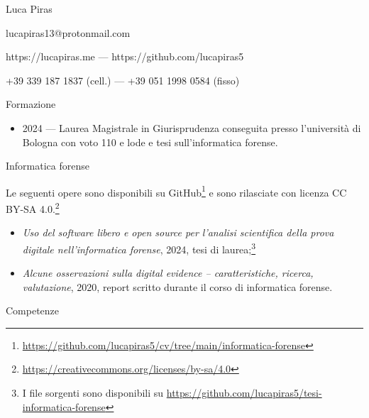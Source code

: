 \documentclass[12pt]{article}
\begin{document}
\pagestyle{empty}

\begin{center}

	{\Huge Luca Piras}

	\vspace{0.616cm}

	lucapiras13@protonmail.com

	https://lucapiras.me --- https://github.com/lucapiras5

	+39 339 187 1837 (cell.) --- +39 051 1998 0584 (fisso)

	\vspace{0.616cm}

\end{center}

{\Large Formazione}

\begin{itemize}
	\item 2024 --- Laurea Magistrale in Giurisprudenza conseguita presso l'università di Bologna con voto 110 e lode e tesi sull'informatica forense.
\end{itemize}

{\Large Informatica forense}

Le seguenti opere sono disponibili su GitHub\footnote{\url{https://github.com/lucapiras5/cv/tree/main/informatica-forense}} e sono rilasciate con licenza CC BY-SA 4.0.\footnote{\url{https://creativecommons.org/licenses/by-sa/4.0}}

\begin{itemize}
	\item \textit{Uso del software libero e open source per l'analisi scientifica della prova digitale nell'informatica forense}, 2024, tesi di laurea;\footnote{I file sorgenti sono disponibili su \url{https://github.com/lucapiras5/tesi-informatica-forense}}
	\item \textit{Alcune osservazioni sulla digital evidence -- caratteristiche, ricerca, valutazione}, 2020, report scritto durante il corso di informatica forense.
\end{itemize}

{\Large Competenze}
\end{document}
